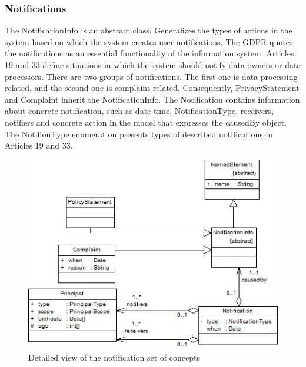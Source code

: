 \documentclass[11pt,english]{article}
\begin{document}
\subsubsection{Notifications}
The NotificationInfo is an abstract class. Generalizes the types of actions in the system based on which the system creates user notifications. The GDPR quotes the notifications as an essential functionality of the information system. Articles 19 and 33 define situations in which the system should notify data owners or data processors. There are two groups of notifications. The first one is data processing related, and the second one is complaint related. Consequently, PrivacyStatement and Complaint inherit the NotificationInfo. The Notification contains information about concrete notification, such as date-time, NotificationType, receivers, notifiers and concrete action in the model that expresses the causedBy object. The NotifionType enumeration presents types of described notifications in Articles 19 and 33.
\begin{figure}[H]
    \centering
    \includegraphics[width=12.5cm]{images/notification.jpg}
    \caption{Detailed view of the notification set of concepts}
    \label{fig:Notifications}
\end{figure}
\end{document}
